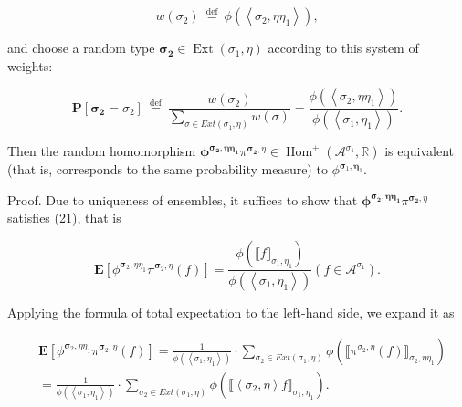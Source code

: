 \documentclass[10pt]{article}
\begin{document}
$$
w\left(\sigma_{2}\right) \stackrel{\text { def }}{=} \phi\left(\left\langle\sigma_{2}, \eta \eta_{1}\right\rangle\right),
$$

and choose a random type $\boldsymbol{\sigma}_{\mathbf{2}} \in \operatorname{Ext}\left(\sigma_{1}, \eta\right)$ according to this system of weights:

$$
\mathbf{P}\left[\boldsymbol{\sigma}_{\mathbf{2}}=\sigma_{2}\right] \stackrel{\text { def }}{=} \frac{w\left(\sigma_{2}\right)}{\sum_{\sigma \in E x t\left(\sigma_{1}, \eta\right)} w(\sigma)}=\frac{\phi\left(\left\langle\sigma_{2}, \eta \eta_{1}\right\rangle\right)}{\phi\left(\left\langle\sigma_{1}, \eta_{1}\right\rangle\right)} .
$$

Then the random homomorphism $\boldsymbol{\phi}^{\boldsymbol{\sigma}_{\mathbf{2}}, \boldsymbol{\eta} \boldsymbol{\eta}_{\mathbf{1}}} \pi^{\boldsymbol{\sigma}_{\mathbf{2}}, \eta} \in \operatorname{Hom}^{+}\left(\mathcal{A}^{\sigma_{1}}, \mathbb{R}\right)$ is equivalent (that is, corresponds to the same probability measure) to $\phi^{\boldsymbol{\sigma}_{1}, \boldsymbol{\eta}_{1}}$.

Proof. Due to uniqueness of ensembles, it suffices to show that $\boldsymbol{\phi}^{\boldsymbol{\sigma}_{\mathbf{2}}, \boldsymbol{\eta} \boldsymbol{\eta}_{\mathbf{1}}} \pi^{\boldsymbol{\sigma}_{\mathbf{2}}, \eta}$ satisfies (21), that is

$$
\mathbf{E}\left[\phi^{\boldsymbol{\sigma}_{2}, \eta \eta_{1}} \pi^{\boldsymbol{\sigma}_{2}, \eta}(f)\right]=\frac{\phi\left(\llbracket f \rrbracket_{\sigma_{1}, \eta_{1}}\right)}{\phi\left(\left\langle\sigma_{1}, \eta_{1}\right\rangle\right)}\left(f \in \mathcal{A}^{\sigma_{1}}\right) .
$$

Applying the formula of total expectation to the left-hand side, we expand it as

$$
\begin{aligned}
& \mathbf{E}\left[\phi^{\boldsymbol{\sigma}_{2}, \eta \eta_{1}} \pi^{\boldsymbol{\sigma}_{2}, \eta}(f)\right]=\frac{1}{\phi\left(\left\langle\sigma_{1}, \eta_{1}\right\rangle\right)} \cdot \sum_{\sigma_{2} \in E x t\left(\sigma_{1}, \eta\right)} \phi\left(\llbracket \pi^{\sigma_{2}, \eta}(f) \rrbracket_{\sigma_{2}, \eta \eta_{1}}\right) \\
& =\frac{1}{\phi\left(\left\langle\sigma_{1}, \eta_{1}\right\rangle\right)} \cdot \sum_{\sigma_{2} \in E x t\left(\sigma_{1}, \eta\right)} \phi\left(\llbracket\left\langle\sigma_{2}, \eta\right\rangle f \rrbracket_{\sigma_{1}, \eta_{1}}\right) .
\end{aligned}
$$
\end{document}
